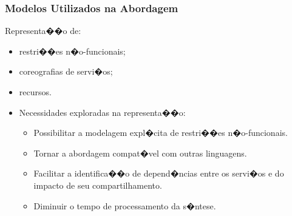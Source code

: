 \documentclass[compress]{beamer}
\newcommand{\semitransp}[2][35]{\textcolor{fg!#1}#2}
\begin{document}
\frame
{
 \frametitle{Modelos Utilizados na Abordagem}
\begin{block}{Representa��o de:}
\footnotesize
\begin{itemize}
 \item[\textcolor{fg!20}{\textbullet}] \semitransp[20]{{restri��es n�o-funcionais;}}
 \item[\textcolor{fg!20}{\textbullet}] \semitransp[20]{{coreografias de servi�os;}}
 \item recursos.
\end{itemize}
\end{block} 
\vspace{0.8cm}
\begin{itemize}
 \item Necessidades exploradas na representa��o:
\begin{itemize}
 \item[\textcolor{fg!20}{\textbullet}] \semitransp[20]{{Possibilitar a modelagem expl�cita de restri��es n�o-funcionais.}}
 \item[\textcolor{fg!20}{\textbullet}] \semitransp[20]{{Tornar a abordagem compat�vel com outras linguagens.}}
 \item[\textcolor{fg!20}{\textbullet}] \semitransp[20]{{Facilitar a identifica��o de depend�ncias entre os servi�os e do impacto de seu compartilhamento.}}
 \item Diminuir o tempo de processamento da s�ntese.
\end{itemize}
\end{itemize}
}


\end{document}
